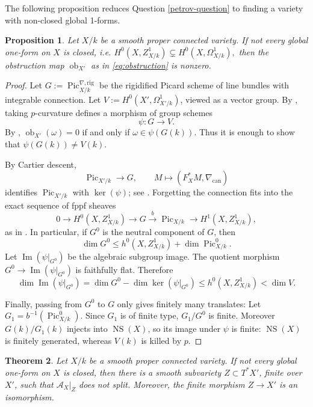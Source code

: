 \documentclass[11pt]{amsart}
\newtheorem{theorem}{Theorem}
\newtheorem{proposition}[theorem]{Proposition}
\DeclareMathOperator{\Pic}{Pic}
\DeclareMathOperator{\NS}{NS}
\begin{document}
The following proposition reduces Question \ref{petrov-question} to finding a variety with non-closed global 1-forms.

\begin{proposition}\label{prop:dimension}
Let \(X/k\) be a smooth proper connected variety.  If not every global
one-form on \(X\) is closed, i.e.
\(
H^0(X,Z^1_{X/k})\subsetneq H^0(X,\Omega^1_{X/k}),
\)
then the obstruction map
\(
\operatorname{ob}_{X'}\) as in \eqref{eq:obstruction}
is nonzero.
\end{proposition}

\begin{proof}
Let \(G:=\Pic^{\nabla,\mathrm{rig}}_{X/k}\)
be the rigidified Picard scheme of line bundles with integrable
connection.  Let \(V:=H^0(X',\Omega^1_{X'/k})\), viewed as a vector group.
By \cite[Proposition 4.11 and the paragraph following it]{OV}, taking \(p\)-curvature defines a morphism of group schemes
\[
\psi\colon G\longrightarrow V.
\]
By \cite[Proposition 4.2]{OV}, \(\operatorname{ob}_{X'}(\omega)=0\) if and only if \(\omega\in\psi(G(k))\).  Thus it is enough to show that
\(\psi(G(k))\ne V(k)\).

By Cartier descent,
\[
\Pic_{X'/k}\longrightarrow G,\qquad
M\longmapsto (F_X^*M,\nabla_{\mathrm{can}})
\]
identifies \(\Pic_{X'/k}\) with \(\ker(\psi)\); see \cite[Theorem 5.1]{Katz}.
Forgetting the connection fits into the exact sequence of fppf sheaves
\begin{equation*}
0\to H^0(X,Z^1_{X/k})\to G\xrightarrow{b}\Pic_{X/k}
\to H^1(X,Z^1_{X/k}),
\end{equation*}
as in \cite[Proposition 4.11]{OV}.  In particular, if \(G^0\) is the neutral
component of \(G\), then
\[
\dim G^0\leq h^0(X,Z^1_{X/k})+\dim \Pic^0_{X/k}.
\]
Let \(\operatorname{Im}(\psi|_{G^0})\) be the algebraic subgroup image.
The quotient morphism \(G^0\to \operatorname{Im}(\psi|_{G^0})\) is 
faithfully flat. Therefore
\[
\dim \operatorname{Im}(\psi|_{G^0})=\dim G^0-\dim\ker(\psi|_{G^0})
\leq h^0(X,Z^1_{X/k})<\dim V.
\]


Finally, passing from \(G^0\) to \(G\) only gives finitely many translates:
Let \(G_1=b^{-1}(\Pic^0_{X/k})\).  Since \(G_1\) is of finite type,
\(G_1/G^0\) is finite.  Moreover \(G(k)/G_1(k)\) injects into \(\NS(X)\), so
its image under \(\psi\) is finite: \(\NS(X)\) is finitely generated, whereas
\(V(k)\) is killed by \(p\).

\end{proof}

\begin{theorem}
    Let $X/k$ be a smooth proper connected variety.
    If not every global one-form on $X$ is closed, then there is a smooth subvariety $Z\subset T^*X'$, finite over $X'$, such that $\mathcal{A}_X|_Z$ does not split. Moreover, the finite morphism $Z\to X'$ is an isomorphism.
\end{theorem}
\end{document}
